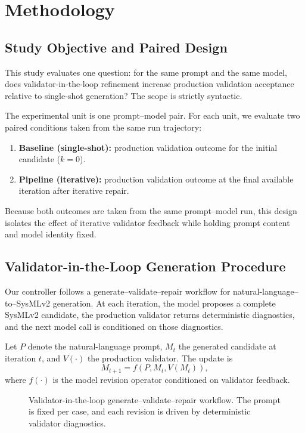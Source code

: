 \section{Methodology}

\subsection{Study Objective and Paired Design}
This study evaluates one question: for the same prompt and the same model, does validator-in-the-loop refinement increase production validation acceptance relative to single-shot generation? The scope is strictly syntactic.

The experimental unit is one prompt--model pair. For each unit, we evaluate two paired conditions taken from the same run trajectory:
\begin{enumerate}
    \item \textbf{Baseline (single-shot):} production validation outcome for the initial candidate ($k=0$).
    \item \textbf{Pipeline (iterative):} production validation outcome at the final available iteration after iterative repair.
\end{enumerate}

Because both outcomes are taken from the same prompt--model run, this design isolates the effect of iterative validator feedback while holding prompt content and model identity fixed.

\subsection{Validator-in-the-Loop Generation Procedure}
Our controller follows a generate--validate--repair workflow for natural-language--to--SysMLv2 generation. At each iteration, the model proposes a complete SysMLv2 candidate, the production validator returns deterministic diagnostics, and the next model call is conditioned on those diagnostics.

Let $P$ denote the natural-language prompt, $M_t$ the generated candidate at iteration $t$, and $V(\cdot)$ the production validator. The update is
\[
M_{t+1} = f\!\left(P, M_t, V(M_t)\right),
\]
where $f(\cdot)$ is the model revision operator conditioned on validator feedback.

\begin{figure}[H]
\centering
\resizebox{\columnwidth}{!}{}
\caption{Validator-in-the-loop generate--validate--repair workflow. The prompt is fixed per case, and each revision is driven by deterministic validator diagnostics.}
\label{fig:gcr_loop_methods}
\end{figure}

